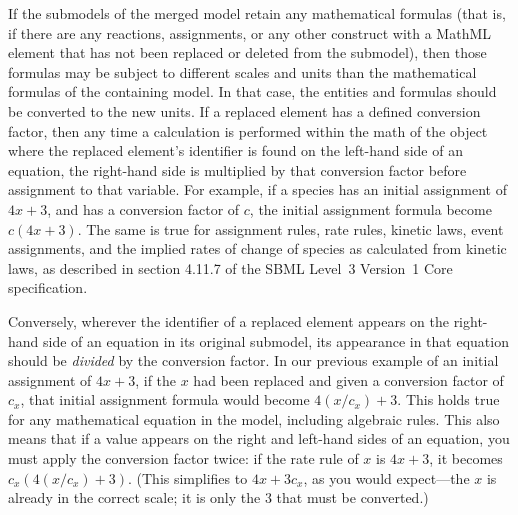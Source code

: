 If the submodels of the merged model retain any mathematical formulas
(that is, if there are any reactions, assignments, or any other
construct with a MathML  element that has not been
replaced or deleted from the submodel), then those formulas may be
subject to different scales and units than the mathematical formulas of
the containing model.  In that case, the entities and formulas should be
converted to the new units.  If a replaced element has a defined
conversion factor, then any time a calculation is performed within the
math of the \Submodel object where the replaced element's identifier is
found on the left-hand side of an equation, the right-hand side is
multiplied by that conversion factor before assignment to that variable.
For example, if a species has an initial assignment of $4x + 3$, and has
a conversion factor of $c$, the initial assignment formula become
$c (4x+3)$.  The same is true for assignment rules, rate
rules, kinetic laws, event assignments, and the implied rates of change
of species as calculated from kinetic laws, as described in section
4.11.7 of the SBML Level~3 Version~1 Core specification.

Conversely, wherever the identifier of a replaced element appears on the
right-hand side of an equation in its original submodel, its appearance
in that equation should be \emph{divided} by the conversion factor.  In
our previous example of an initial assignment of $4x+3$, if the $x$ had
been replaced and given a conversion factor of $c_x$, that initial
assignment formula would become $4(x/c_x)+3$.  This holds true for any
mathematical equation in the model, including algebraic rules.  This
also means that if a value appears on the right and left-hand sides of
an equation, you must apply the conversion factor twice: if the rate
rule of $x$ is $4x+3$, it becomes $c_x(4(x/c_x) + 3)$.  (This
simplifies to $4x + 3c_x$, as you would expect---the $x$ is already in
the correct scale; it is only the 3 that must be converted.)



